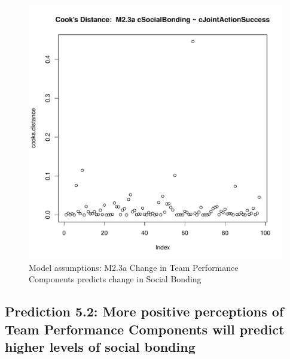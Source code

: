 \begin{figure}[htbp]
        \includegraphics[scale =.4]{images/MLM23aCooksD.pdf}
        \caption{Model assumptions: M2.3a Change in Team Performance Components predicts change in Social Bonding}
        \label{fig:MLM23aAssumptions}
      \end{figure}







      \subsection{Prediction 5.2: More positive perceptions of Team Performance Components will predict higher levels of social bonding}







